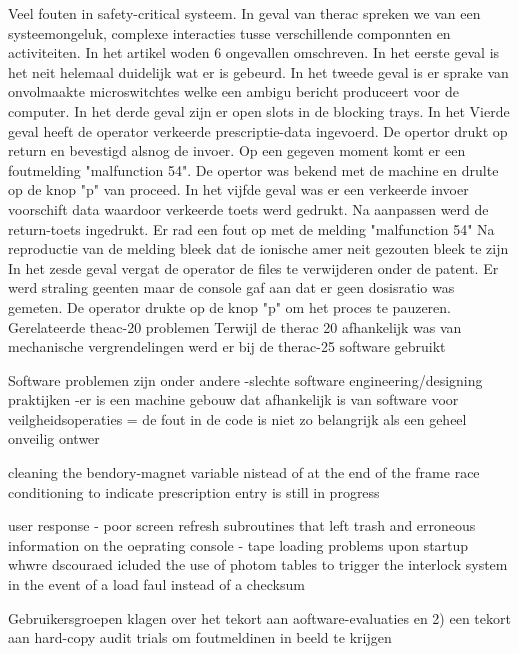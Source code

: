 Veel fouten in safety-critical systeem. In geval van therac spreken we van een systeemongeluk, complexe interacties tusse verschillende componnten en activiteiten. In het artikel woden 6 ongevallen omschreven.
In het eerste geval is het neit helemaal duidelijk wat er is gebeurd.
In het tweede geval is er sprake van onvolmaakte microswitchtes welke	 een ambigu bericht produceert voor de computer.
In het derde geval zijn er open slots in de blocking trays.
In het Vierde geval  heeft de operator verkeerde prescriptie-data ingevoerd. De opertor drukt op return en bevestigd alsnog de invoer. Op een gegeven moment komt er een foutmelding "malfunction 54". De opertor was bekend met de machine en drulte op de knop "p" van proceed.
In het vijfde geval was er een verkeerde invoer voorschift data waardoor verkeerde toets werd gedrukt. Na aanpassen werd de return-toets ingedrukt. Er rad een fout op met de melding "malfunction 54" Na reproductie van de melding bleek dat de ionische amer neit gezouten bleek te zijn
In het zesde geval vergat de operator de files te verwijderen onder de patent. Er werd straling geenten maar de console gaf aan dat er geen dosisratio was gemeten. De operator drukte op de knop "p" om het proces te pauzeren.
Gerelateerde theac-20 problemen
Terwijl de therac 20 afhankelijk was van mechanische vergrendelingen werd er bij de therac-25 software gebruikt

Software problemen zijn onder andere
-slechte software engineering/designing praktijken
-er is een machine gebouw dat afhankelijk is van software voor veilgheidsoperaties
= de fout in de code is niet zo belangrijk als een geheel onveilig ontwer

cleaning the  bendory-magnet variable nistead of at the end of the frame
race conditioning to indicate prescription entry is still in progress


user response
- poor screen refresh subroutines that left trash and erroneous information on the oeprating console
- tape loading problems upon startup whwre dscouraed icluded the use of photom tables to trigger the interlock system in the event of a  load faul instead of a checksum

Gebruikersgroepen klagen over het tekort aan aoftware-evaluaties en 2) een tekort aan hard-copy audit trials om foutmeldinen in beeld te krijgen


